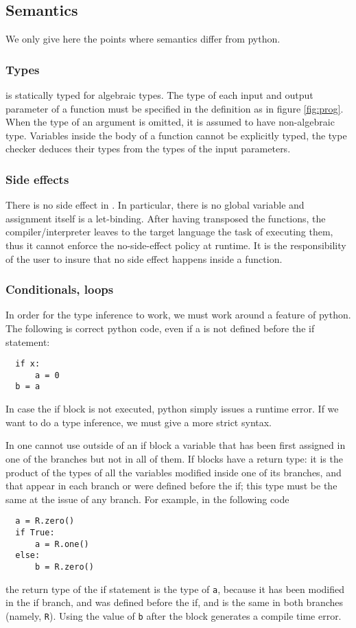 \subsection{Semantics}
We only give here the points where \tALpy{} semantics differ from
python.

\subsubsection{Types}
\tALpy{} is statically typed for algebraic types. The type of each
input and output parameter of a function must be specified in the
definition as in figure \ref{fig:prog}. When the type of an argument
is omitted, it is assumed to have non-algebraic type. Variables inside
the body of a function cannot be explicitly typed, the type checker
deduces their types from the types of the input parameters.

\subsubsection{Side effects}
There is no side effect in \tALpy{}. In particular, there is no global
variable and assignment itself is a let-binding. After having
transposed the functions, the \tALpy{} compiler/interpreter leaves to
the target language the task of executing them, thus it cannot enforce
the no-side-effect policy at runtime. It is the responsibility of the
user to insure that no side effect happens inside a \tALpy{} function.

\subsubsection{Conditionals, loops}
\label{sec:conditionals-loops}
In order for the type inference to work, we must work around a feature
of python. The following is correct python code, even if a is not
defined before the if statement:
\begin{lstlisting}
  if x:
      a = 0
  b = a
\end{lstlisting}
In case the if block is not executed, python simply issues a runtime
error. If we want to do a type inference, we must give a more strict
syntax.

In \tALpy{} one cannot use outside of an if block a variable that has
been first assigned in one of the branches but not in all of them.  If
blocks have a return type: it is the product of the types of all the
variables modified inside one of its branches, and that appear in each
branch or were defined before the if; this type must be the same at
the issue of any branch. For example, in the following code
\begin{lstlisting}
  a = R.zero()
  if True:
      a = R.one()
  else:
      b = R.zero()
\end{lstlisting}
the return type of the if statement is the type of \lstinline{a},
because it has been modified in the if branch, and was defined before
the if, and is the same in both branches (namely,
\lstinline{R}). Using the value of \lstinline{b} after the block
generates a compile time error.

